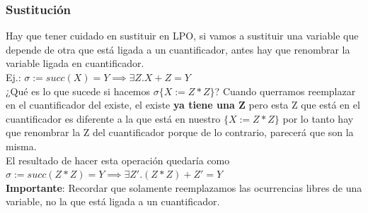 \documentclass[10pt,a4paper]{article}
\begin{document}
\subsubsection*{Sustitución}
Hay que tener cuidado en sustituir en LPO, si vamos a sustituir una variable que depende de otra que está ligada a un cuantificador, antes hay que renombrar la variable ligada en cuantificador. \\
Ej.: $\sigma := succ(X) = Y \implies \exists Z.X+Z = Y$\\
¿Qué es lo que sucede si hacemos $\sigma \{X:=Z*Z\}$? Cuando querramos reemplazar en el cuantificador del existe, el existe \textbf{ya tiene una Z} pero esta Z que está en el cuantificador es diferente a la que está en nuestro $\{X:=Z*Z\}$ por lo tanto hay que renombrar la Z del cuantificador porque de lo contrario, parecerá que son la misma. \\
El resultado de hacer esta operación quedaría como $\sigma := succ(Z*Z) = Y \implies \exists Z'.(Z*Z)+Z' = Y$ \\
\textbf{Importante}: Recordar que solamente reemplazamos las ocurrencias libres de una variable, no la que está ligada a un cuantificador. 
\end{document}
